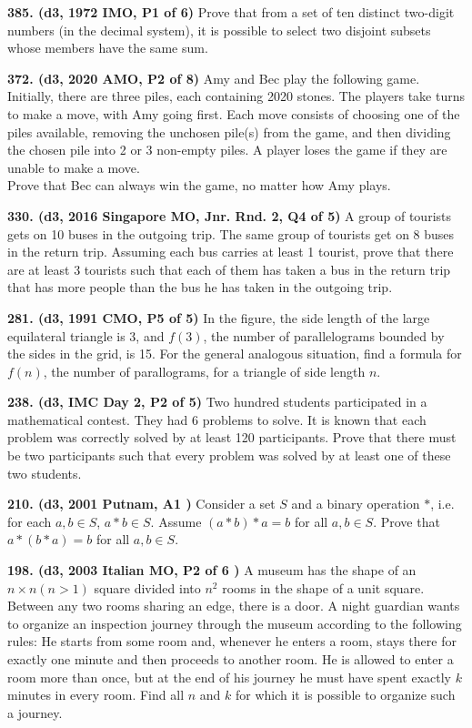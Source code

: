 \documentclass{article}
\begin{document}
        \textbf{385. (\color{red}d3\color{black}, 1972 IMO, P1 of 6)} Prove that from a set of ten distinct two-digit numbers (in the decimal system), it is possible to select two disjoint subsets whose members have the same sum.

        \textbf{372. (\color{red}d3\color{black}, 2020 AMO, P2 of 8)} Amy and Bec play the following game. Initially, there are three piles, each containing 2020 stones. The players take turns to make a move, with Amy going first. Each move consists of choosing one of the piles available, removing the unchosen pile(s) from the game, and then dividing the chosen pile into 2 or 3 non-empty piles. A player loses the game if they are unable to make a move. \\
        Prove that Bec can always win the game, no matter how Amy plays.

        \textbf{330. (\color{red}d3\color{black}, 2016 Singapore MO, Jnr. Rnd. 2, Q4 of 5)} A group of tourists gets on 10 buses in the outgoing trip. The same group of tourists get on 8 buses in the return trip. Assuming each bus carries at least 1 tourist, prove that there are at least 3 tourists such that each of them has taken a bus in the return trip that has more people than the bus he has taken in the outgoing trip.

        \textbf{281. (\color{red}d3\color{black}, 1991 CMO, P5 of 5)} In the figure, the side length of the large equilateral triangle is 3, and $f(3)$, the number of parallelograms bounded by the sides in the grid, is 15. For the general analogous situation, find a formula for $f(n)$, the number of parallograms, for a triangle of side length $n$.

        \textbf{238. (\color{red}d3\color{black}, IMC Day 2, P2 of 5)} Two hundred students participated in a mathematical contest. They had 6 problems to solve. It is known that each problem was correctly solved by at least 120 participants. Prove that there must be two participants such that every problem was solved by at least one of these two students.

        \textbf{210. (\color{red}d3\color{black}, 2001 Putnam, A1   )} Consider a set $S$ and a binary operation $*$, i.e. for each $a,b\in S$, $a*b\in S$. Assume $(a*b)*a=b$ for all $a,b\in S$. Prove that $a*(b*a)=b$ for all $a,b \in S$.

        \textbf{198. (\color{red}d3\color{black}, 2003 Italian MO, P2 of 6        )} A museum has the shape of an \(n \times n (n > 1)\) square divided into \(n^2\) rooms in the shape of a unit square. Between any two rooms sharing an edge, there is a door. A night guardian wants to organize an inspection journey through the museum according to the following rules: He starts from some room and, whenever he enters a room, stays there for exactly one minute and then proceeds to another room. He is allowed to enter a room more than once, but at the end of his journey he must have spent exactly \(k\) minutes in every room. Find all \(n\) and \(k\) for which it is possible to organize such a journey.
\end{document}
